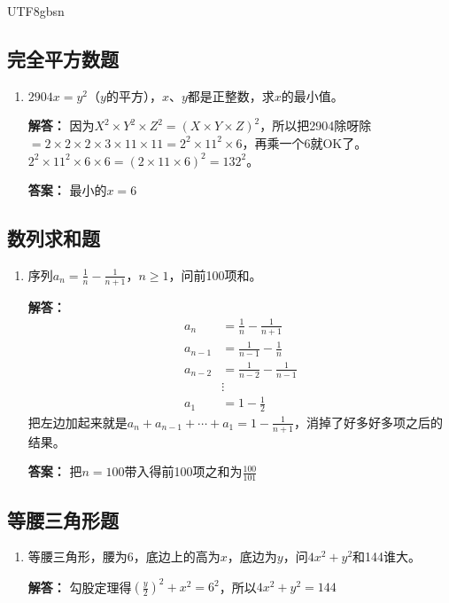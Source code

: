 \documentclass[12pt]{article}
\begin{document}
\begin{CJK*}{UTF8}{gbsn}
\subsection{完全平方数题}
\begin{enumerate}
    \item $2904x = y^2$（$y$的平方），$x$、$y$都是正整数，求$x$的最小值。
    
    \textbf{解答：} 因为$X^2 \times Y^2 \times Z^2 = (X \times Y \times Z)^2$，所以把2904除呀除$= 2 \times 2 \times 2 \times 3 \times 11 \times 11 = 2^2 \times 11^2 \times 6$，再乘一个6就OK了。$2^2 \times 11^2 \times 6 \times 6 = (2 \times 11 \times 6)^2 = 132^2$。
    
    \textbf{答案：} 最小的$x = 6$
\end{enumerate}

\subsection{数列求和题}
\begin{enumerate}
    \item 序列$a_n = \frac{1}{n} - \frac{1}{n+1}$，$n \geq 1$，问前100项和。
    
    \textbf{解答：}
    \begin{align*}
        a_n &= \frac{1}{n} - \frac{1}{n+1} \\
        a_{n-1} &= \frac{1}{n-1} - \frac{1}{n} \\
        a_{n-2} &= \frac{1}{n-2} - \frac{1}{n-1} \\
        &\vdots \\
        a_1 &= 1 - \frac{1}{2}
    \end{align*}
    把左边加起来就是$a_n + a_{n-1} + \cdots + a_1 = 1 - \frac{1}{n+1}$，消掉了好多好多项之后的结果。
    
    \textbf{答案：} 把$n = 100$带入得前100项之和为$\frac{100}{101}$
\end{enumerate}

\subsection{等腰三角形题}
\begin{enumerate}
    \item 等腰三角形，腰为6，底边上的高为$x$，底边为$y$，问$4x^2 + y^2$和144谁大。
    
    \textbf{解答：} 勾股定理得$(\frac{y}{2})^2 + x^2 = 6^2$，所以$4x^2 + y^2 = 144$
\end{enumerate}


\end{CJK*}
\end{document}
